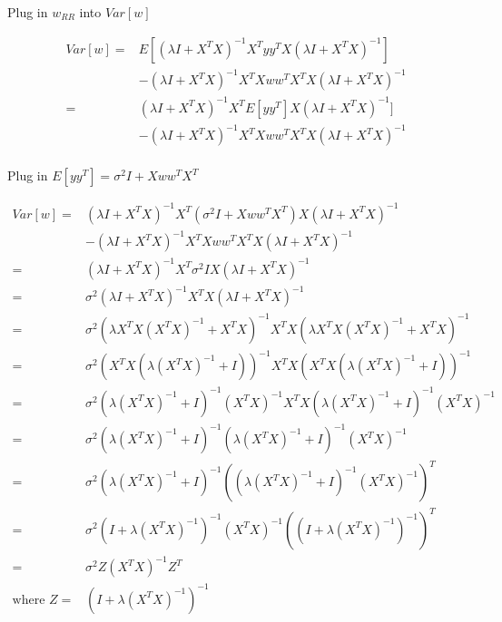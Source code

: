 \documentclass[11pt]{report}
\begin{document}
\begin{flushleft}
Plug in $w_{RR}$ into $Var[w]$
\end{flushleft}

\begin{equation*}
\begin{split}
Var[w] =  &E[(\lambda I + X^TX)^{-1}X^Ty  y^T X (\lambda I + X^TX)^{-1}] \\
& - (\lambda I + X^TX)^{-1}X^TXw w^T X^T X (\lambda I + X^TX)^{-1}\\
= &(\lambda I + X^TX)^{-1}X^T E[y y^T] X (\lambda I + X^TX)^{-1}] \\
& - (\lambda I + X^TX)^{-1}X^TXw w^T X^T X (\lambda I + X^TX)^{-1}\\
\end{split} 
\end{equation*}

\begin{flushleft}
Plug in $E[yy^T] = \sigma^2I + Xww^TX^T$
\end{flushleft}

\begin{equation*}
\begin{split}
Var[w] = &(\lambda I + X^TX)^{-1}X^T (\sigma^2I + Xww^TX^T) X (\lambda I + X^TX)^{-1} \\
& - (\lambda I + X^TX)^{-1}X^TXw w^T X^T X (\lambda I + X^TX)^{-1}\\
= &(\lambda I + X^TX)^{-1}X^T \sigma^2I X (\lambda I + X^TX)^{-1}  \\
= &\sigma^2 (\lambda I + X^TX)^{-1}X^T X (\lambda I + X^TX)^{-1}  \\
= &\sigma^2 (\lambda X^TX(X^TX)^{-1} + X^TX)^{-1}X^T X(\lambda X^TX(X^TX)^{-1} + X^TX)^{-1}  \\
= &\sigma^2 (X^TX(\lambda (X^TX)^{-1} + I))^{-1}X^T X (X^TX(\lambda (X^TX)^{-1} + I))^{-1}  \\
= &\sigma^2 (\lambda (X^TX)^{-1} + I)^{-1} (X^TX)^{-1} X^T X (\lambda (X^TX)^{-1} + I)^{-1} (X^TX)^{-1} \\
= &\sigma^2 (\lambda (X^TX)^{-1} + I)^{-1} (\lambda (X^TX)^{-1} + I)^{-1} (X^TX)^{-1} \\
= &\sigma^2 (\lambda (X^TX)^{-1} + I)^{-1} ((\lambda (X^TX)^{-1} + I)^{-1} (X^TX)^{-1})^T \\
= &\sigma^2 (I + \lambda(X^TX)^{-1})^{-1}  (X^TX)^{-1} ((I + \lambda(X^TX)^{-1})^{-1})^T \\
= &\sigma^2 Z (X^TX)^{-1} Z^T \\
\text{where } Z = &(I + \lambda (X^TX)^{-1})^{-1}
\end{split} 
\end{equation*}
\end{document}
